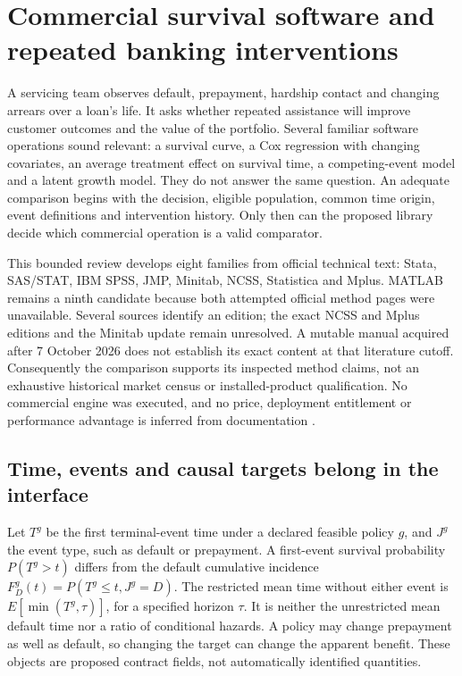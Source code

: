 \section{Commercial survival software and repeated banking interventions}
\label{exec15:commercial-survival}

A servicing team observes default, prepayment, hardship contact and changing
arrears over a loan's life. It asks whether repeated assistance will improve
customer outcomes and the value of the portfolio. Several familiar software
operations sound relevant: a survival curve, a Cox regression with changing
covariates, an average treatment effect on survival time, a competing-event
model and a latent growth model. They do not answer the same question.
An adequate comparison begins with the decision, eligible population, common
time origin, event definitions and intervention history. Only then can the
proposed library decide which commercial operation is a valid comparator.

This bounded review develops eight families from official technical text:
Stata, SAS/STAT, IBM SPSS, JMP, Minitab, NCSS, Statistica and Mplus. MATLAB
remains a ninth candidate because both attempted official method pages were
unavailable. Several sources identify an edition; the exact NCSS and Mplus
editions and the Minitab update remain unresolved. A mutable manual acquired
after 7 October 2026 does not establish its exact content at that literature
cutoff. Consequently the comparison supports its inspected method claims,
not an exhaustive historical market census or installed-product qualification.
No commercial engine was executed, and no price, deployment entitlement or
performance advantage is inferred from documentation
\citep{exec14_survival_survey}.

\subsection{Time, events and causal targets belong in the interface}

Let $T^g$ be the first terminal-event time under a declared feasible policy
$g$, and $J^g$ the event type, such as default or prepayment. A first-event
survival probability $P(T^g>t)$ differs from the default cumulative incidence
$F_D^g(t)=P(T^g\leq t,J^g=D)$. The restricted mean time without either event
is $E[\min(T^g,\tau)]$, for a specified horizon $\tau$. It is neither the
unrestricted mean default time nor a ratio of conditional hazards. A policy
may change prepayment as well as default, so changing the target can change
the apparent benefit. These objects are proposed contract fields, not
automatically identified quantities.

